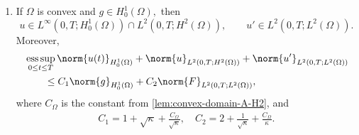 \begin{theorem}
\begin{enumerate}[label=\textup{(\arabic*)}]
\item\label{thm:heat-estimates-h1} If \(\Omega\) is convex and
\(
    g\in H_0^1(\Omega),
\)
then
\begin{equation}\label{eq:u-increased-reg}
    u\in L^\infty(0,T;H_0^1(\Omega))
    \cap L^2(0,T;H^2(\Omega)),
    \qquad
    u'\in L^2(0,T;L^2(\Omega)).
\end{equation}
Moreover,
\begin{equation}\label{eq:explicit-H1-H2-estimate}
\begin{split}
    &\operatorname*{ess\,sup}_{0\le t\le T}\norm{u(t)}_{H_0^1(\Omega)}
    +
    \norm{u}_{L^2(0,T;H^2(\Omega))}
    +
    \norm{u'}_{L^2(0,T;L^2(\Omega))}\\
    &\qquad\le
    C_1
    \norm{g}_{H_0^1(\Omega)}
    +
    C_2
    \norm{F}_{L^2(0,T;L^2(\Omega))},
\end{split}
\end{equation}
where \(C_\Omega\) is the constant from \cref{lem:convex-domain-A-H2}, and
\begin{equation}\label{eq:C-H1-H2}
\begin{gathered}
    C_1
    =
    1+\sqrt{\kappa}+\frac{C_\Omega}{\sqrt{\kappa}},
    \quad
    C_2
    =
    2+\frac1{\sqrt{\kappa}}+\frac{C_\Omega}{\kappa}.
\end{gathered}
\end{equation}
\end{enumerate}
\end{theorem}

